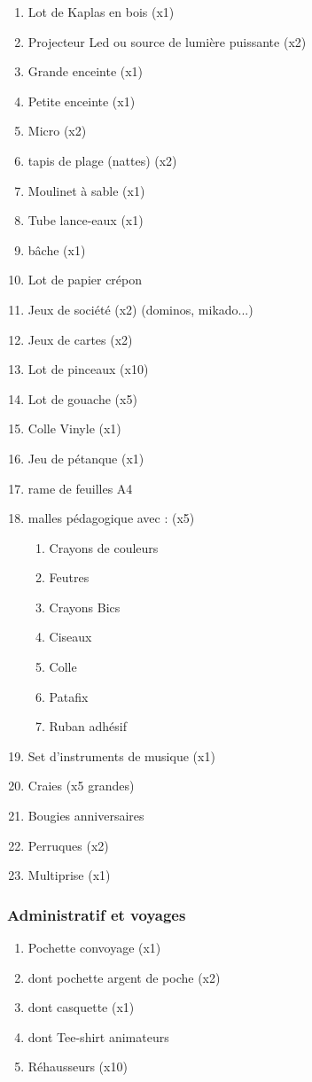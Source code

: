\documentclass{article}
\begin{document}
\begin{enumerate}
    \item Lot de Kaplas en bois (x1)
    \item Projecteur Led ou source de lumière puissante  (x2)
    \item Grande enceinte (x1)
    \item Petite enceinte (x1)
    \item Micro (x2)
    \item tapis de plage (nattes)  (x2)
    \item Moulinet à sable (x1)
    \item Tube lance-eaux (x1)
    \item bâche (x1)
    \item Lot de papier crépon
    \item Jeux de société (x2) (dominos, mikado...)
    \item Jeux de cartes (x2)
    \item Lot de pinceaux (x10)
    \item Lot de gouache (x5)
    \item Colle Vinyle (x1)
    \item Jeu de pétanque (x1)
    \item rame de feuilles A4
    \item malles pédagogique avec : (x5)
    \begin{enumerate}
        \item Crayons de couleurs
        \item Feutres
        \item Crayons Bics
        \item Ciseaux
        \item Colle
        \item Patafix
        \item Ruban adhésif
    \end{enumerate}
    \item Set d'instruments de musique (x1)
    \item Craies (x5 grandes)
    \item Bougies anniversaires
    \item Perruques (x2)
    \item Multiprise (x1)

    
    
\end{enumerate}



\subsubsection{Administratif et voyages}

\begin{enumerate}
    \item Pochette convoyage (x1)
    \item dont pochette argent de poche  (x2)
    \item dont casquette (x1)
    \item dont Tee-shirt animateurs
    \item Réhausseurs (x10)
\end{enumerate}


\newpage
\end{document}
